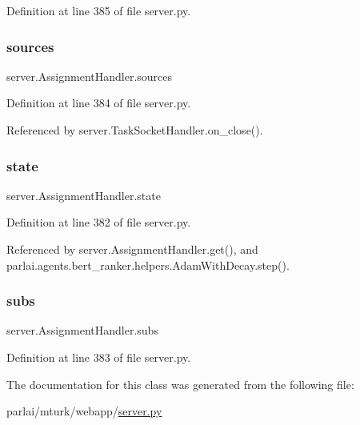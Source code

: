 Definition at line 385 of file server.\+py.

\mbox{\label{classserver_1_1AssignmentHandler_af8e15a70af1d39ae87ee9cf390ed67f3}} 
\subsubsection{\texorpdfstring{sources}{sources}}
{\footnotesize\ttfamily server.\+Assignment\+Handler.\+sources}



Definition at line 384 of file server.\+py.



Referenced by server.\+Task\+Socket\+Handler.\+on\+\_\+close().

\mbox{\label{classserver_1_1AssignmentHandler_a3530053d0649bd3b9cc31f7a5a7968d2}} 
\subsubsection{\texorpdfstring{state}{state}}
{\footnotesize\ttfamily server.\+Assignment\+Handler.\+state}



Definition at line 382 of file server.\+py.



Referenced by server.\+Assignment\+Handler.\+get(), and parlai.\+agents.\+bert\+\_\+ranker.\+helpers.\+Adam\+With\+Decay.\+step().

\mbox{\label{classserver_1_1AssignmentHandler_a30b256ba03dc18275a5bbbd8865aaf0b}} 
\subsubsection{\texorpdfstring{subs}{subs}}
{\footnotesize\ttfamily server.\+Assignment\+Handler.\+subs}



Definition at line 383 of file server.\+py.



The documentation for this class was generated from the following file\+:\begin{DoxyCompactItemize}
\item 
parlai/mturk/webapp/\hyperlink{server_8py}{server.\+py}\end{DoxyCompactItemize}
